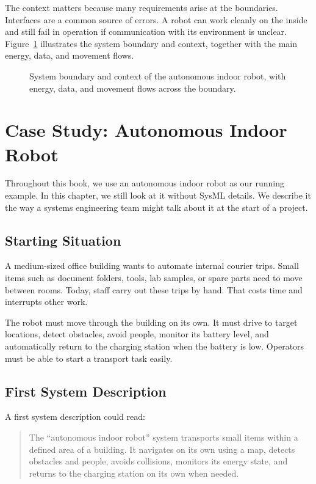 The context matters because many requirements arise at the boundaries. Interfaces are a common source of errors. A robot can work cleanly on the inside and still fail in operation if communication with its environment is unclear. Figure~\ref{fig:kap01-systemgrenze} illustrates the system boundary and context, together with the main energy, data, and movement flows.

\begin{figure}[H]
  \centering
  \caption{System boundary and context of the autonomous indoor robot, with energy, data, and movement flows across the boundary.}
  \label{fig:kap01-systemgrenze}
\end{figure}

\section{Case Study: Autonomous Indoor Robot}
Throughout this book, we use an autonomous indoor robot as our running example. In this chapter, we still look at it without SysML details. We describe it the way a systems engineering team might talk about it at the start of a project.

\subsection{Starting Situation}
A medium-sized office building wants to automate internal courier trips. Small items such as document folders, tools, lab samples, or spare parts need to move between rooms. Today, staff carry out these trips by hand. That costs time and interrupts other work.

The robot must move through the building on its own. It must drive to target locations, detect obstacles, avoid people, monitor its battery level, and automatically return to the charging station when the battery is low. Operators must be able to start a transport task easily.

\subsection{First System Description}
A first system description could read:

\begin{quote}
The \enquote{autonomous indoor robot} system transports small items within a defined area of a building. It navigates on its own using a map, detects obstacles and people, avoids collisions, monitors its energy state, and returns to the charging station on its own when needed.
\end{quote}

